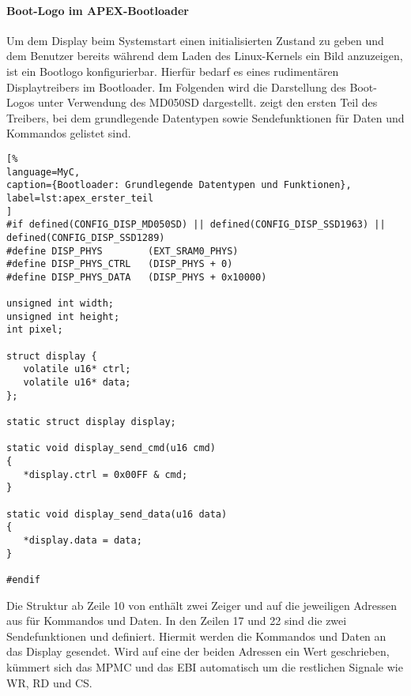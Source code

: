 \paragraph{Boot-Logo im APEX-Bootloader}
Um dem Display beim Systemstart einen initialisierten Zustand zu geben und dem Benutzer bereits während dem Laden des Linux-Kernels ein Bild anzuzeigen, ist ein Bootlogo konfigurierbar. Hierfür bedarf es eines rudimentären Displaytreibers im Bootloader. Im Folgenden wird die Darstellung des Boot-Logos unter Verwendung des MD050SD dargestellt.  zeigt den ersten Teil des Treibers, bei dem grundlegende Datentypen sowie Sendefunktionen für Daten und Kommandos gelistet sind. 

\begin{lstlisting}[%
language=MyC,
caption={Bootloader: Grundlegende Datentypen und Funktionen},
label=lst:apex_erster_teil
]
#if defined(CONFIG_DISP_MD050SD) || defined(CONFIG_DISP_SSD1963) || defined(CONFIG_DISP_SSD1289)
#define DISP_PHYS        (EXT_SRAM0_PHYS)
#define DISP_PHYS_CTRL   (DISP_PHYS + 0)
#define DISP_PHYS_DATA   (DISP_PHYS + 0x10000)

unsigned int width;
unsigned int height;
int pixel;

struct display {
   volatile u16* ctrl;
   volatile u16* data;
};

static struct display display;

static void display_send_cmd(u16 cmd)
{
   *display.ctrl = 0x00FF & cmd;
}

static void display_send_data(u16 data)
{
   *display.data = data;
}

#endif
\end{lstlisting}

Die Struktur  ab Zeile 10 von  enthält zwei Zeiger  und  auf die jeweiligen Adressen aus  für Kommandos und Daten. In den Zeilen 17 und 22 sind die zwei Sendefunktionen  und 
 definiert. Hiermit werden die Kommandos und Daten an das Display gesendet. Wird auf eine der beiden Adressen ein Wert geschrieben, kümmert sich das MPMC und das EBI automatisch um die restlichen Signale wie WR, RD und CS. 

